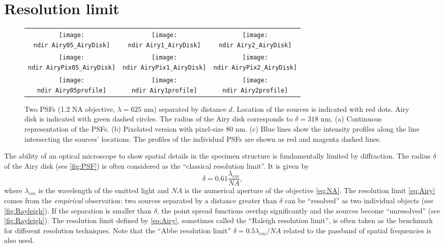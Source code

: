 
\section{Resolution limit \label{sec:Resolution limit}}

\begin{figure}[!bht]
	\centering
	\newcommand{\wf}{.3\textwidth}	
	\newcommand{\ndir}{figures/psfillustration/}
	\begin{tabular}{ccc}
		\subfloat[$d=\delta/2$]{\texttt{[image: \\ndir Airy05\_AiryDisk]}}
		& \subfloat[$d=\delta$]{\texttt{[image: \\ndir Airy1\_AiryDisk]}}
		& \subfloat[$d=2\delta$]{\texttt{[image: \\ndir Airy2\_AiryDisk]}}
		\tabularnewline
		\subfloat[$d=\delta/2$]{\texttt{[image: \\ndir AiryPix05\_AiryDisk]}}
		& \subfloat[$d=\delta$]{\texttt{[image: \\ndir AiryPix1\_AiryDisk]}}
		& \subfloat[$d=2\delta$]{\texttt{[image: \\ndir AiryPix2\_AiryDisk]}}
		\tabularnewline
		\subfloat[$d=\delta/2$]{\texttt{[image: \\ndir Airy05profile]}}
		& \subfloat[$d=\delta$]{\texttt{[image: \\ndir Airy1profile]}}
		& \subfloat[$d=2\delta$]{\texttt{[image: \\ndir Airy2profile]}}
		\tabularnewline
	\end{tabular}
	\caption{Two PSFs (1.2 NA objective, $\lambda=625$ nm) separated by distance $d$. Location of the sources is indicated with red dots. Airy disk is indicated with green dashed circles. The radius of the Airy disk corresponds to $\delta=318$ nm. (a) Continuous representation of the PSFs. (b) Pixelated version with pixel-size 80 nm. (c) Blue lines show the intensity profiles along the line intersecting the sources' locations. The profiles of the individual PSFs are shown as red and magenta dashed lines.}
	\label{fig:Rayleigh}
\end{figure}
%
The ability of an optical microscope to show spatial details in the specimen structure is fundamentally limited by diffraction. The radius $\delta$ of the Airy disk (see \autoref{fig:PSF}) is often considered as the ``classical resolution limit''. It is given by
%
\begin{equation}
 	\delta=0.61\frac{\lambda_{em}}{\unit{NA}}, 
	\label{eq:Airy}
\end{equation}
%
where $\lambda_{em}$ is the wavelength of the emitted light and $\unit{NA}$ is the numerical aperture of the objective \autoref{eq:NA}. The resolution limit \autoref{eq:Airy} comes from the \emph{empirical} observation: two sources separated by a distance greater than $\delta$ can be ``resolved'' as two individual objects (see \autoref{fig:Rayleigh}\ccc). If the separation is smaller than $\delta$, the point spread functions overlap significantly and the sources become ``unresolved'' (see \autoref{fig:Rayleigh}\aaa). The resolution limit defined by \autoref{eq:Airy}, sometimes called  the ``Raleigh resolution limit'',  is often taken as the benchmark for different resolution techniques. Note that the ``Abbe resolution limit'' $\delta=0.5\lambda_{em}/\unit{NA}$ related to the passband of spatial frequencies is also used.

